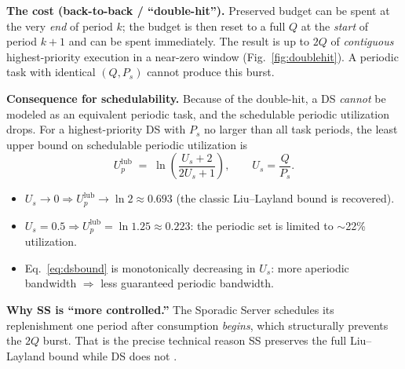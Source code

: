\documentclass[conference]{IEEEtran}
\begin{document}
\noindent\textbf{The cost (back-to-back / ``double-hit'').} Preserved budget can
be spent at the very \emph{end} of period $k$; the budget is then reset to a
full $Q$ at the \emph{start} of period $k{+}1$ and can be spent immediately.
The result is up to $2Q$ of \emph{contiguous} highest-priority execution in a
near-zero window (Fig.~\ref{fig:doublehit}). A periodic task with identical
$(Q,P_s)$ cannot produce this burst.

\noindent\textbf{Consequence for schedulability.} Because of the double-hit, a
DS \emph{cannot} be modeled as an equivalent periodic task, and the schedulable
periodic utilization drops. For a highest-priority DS with $P_s$ no larger than
all task periods, the least upper bound on schedulable periodic utilization is
\cite{lehoczky1987enhanced,strosnider1995deferrable}
\begin{equation}
  U_p^{\mathrm{lub}} \;=\; \ln\!\left(\frac{U_s + 2}{2U_s + 1}\right),
  \qquad U_s=\frac{Q}{P_s}.
  \label{eq:dsbound}
\end{equation}
\begin{itemize}
  \item $U_s \to 0 \Rightarrow U_p^{\mathrm{lub}} \to \ln 2 \approx 0.693$
        (the classic Liu--Layland bound is recovered).
  \item $U_s = 0.5 \Rightarrow U_p^{\mathrm{lub}} = \ln 1.25 \approx 0.223$:
        the periodic set is limited to $\sim$22\% utilization.
  \item Eq.~\eqref{eq:dsbound} is monotonically decreasing in $U_s$: more
        aperiodic bandwidth $\Rightarrow$ less guaranteed periodic bandwidth.
\end{itemize}
\noindent\textbf{Why SS is ``more controlled.''} The Sporadic Server schedules
its replenishment one period after consumption \emph{begins}, which
structurally prevents the $2Q$ burst. That is the precise technical reason SS
preserves the full Liu--Layland bound while DS does not
\cite{sprunt1989aperiodic}.
\end{document}
